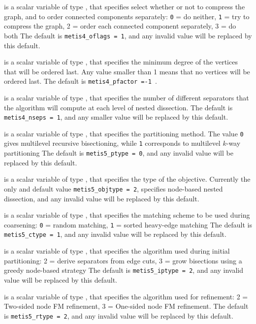 \documentclass{galahad}
\begin{document}
\begin{description}
 is a scalar variable of type \integer, that specifies
select whether or not to compress the graph, and to order connected 
 components separately: {\tt 0} = do neither, {\tt 1} = try to compress 
the graph, 
 2 = order each connected component separately, 3 = do both
The default is {\tt metis4\_oflags = 1}, and any invalid value will be
replaced by this default.

 is a scalar variable of type \integer, that specifies
the minimum degree of the vertices that will be ordered last. Any value
smaller than 1 means that no vertices will be ordered last.
The default is {\tt metis4\_pfactor =-1 }.

 is a scalar variable of type \integer, that specifies
the number of different separators that the algorithm will compute
at each level of nested dissection.
The default is {\tt metis4\_nseps = 1}, and any smaller value
will be replaced by this default.

 is a scalar variable of type \integer, that specifies
the partitioning method. The value {\tt 0} gives multilevel recursive 
bisectioning, while {\tt 1} corresponds to multilevel $k$-way partitioning
The default is {\tt metis5\_ptype = 0}, and any invalid value will be
replaced by this default.

 is a scalar variable of type \integer, that specifies
the type of the objective. Currently the only and default value
{\tt metis5\_objtype = 2}, specifies node-based nested dissection, 
and any invalid value will be replaced by this default.

 is a scalar variable of type \integer, that specifies
the matching scheme to be used during coarsening: {\tt 0} = random matching, 
 {\tt 1} = sorted heavy-edge matching
The default is {\tt metis5\_ctype = 1}, and any invalid value will be
replaced by this default.

 is a scalar variable of type \integer, that specifies
the algorithm used during initial partitioning:
 2 = derive separators from edge cuts,
 3 = grow bisections using a greedy node-based strategy
The default is {\tt metis5\_iptype = 2}, and any invalid value will be
replaced by this default.

 is a scalar variable of type \integer, that specifies
the algorithm used for refinement: 2 = Two-sided node FM refinement,
 3 = One-sided node FM refinement.
The default is {\tt metis5\_rtype = 2}, and any invalid value will be
replaced by this default.


\end{description}
\end{document}
